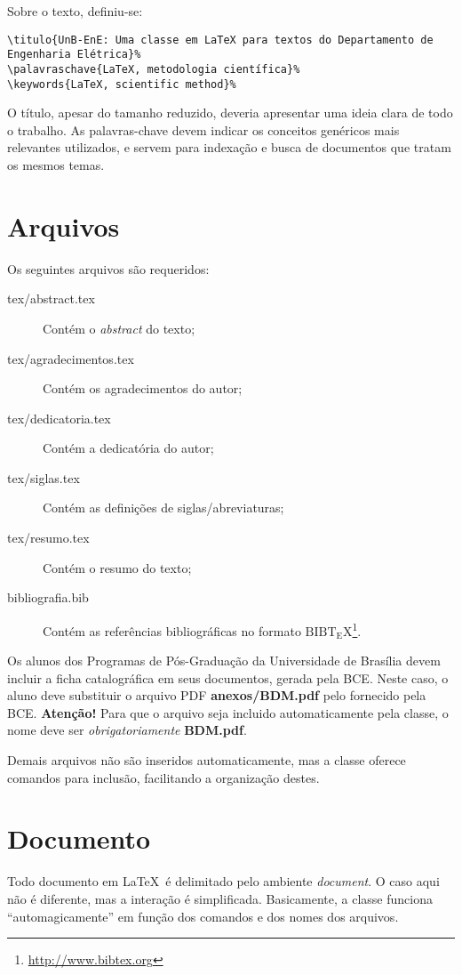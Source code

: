 Sobre o texto, definiu-se:
\begin{verbatim}
\titulo{UnB-EnE: Uma classe em LaTeX para textos do Departamento de Engenharia Elétrica}%
\palavraschave{LaTeX, metodologia científica}%
\keywords{LaTeX, scientific method}%
\end{verbatim}

O título, apesar do tamanho reduzido, deveria apresentar uma ideia clara de todo o trabalho. As
palavras-chave devem indicar os conceitos genéricos mais relevantes utilizados, e servem para 
indexação e busca de documentos que tratam os mesmos temas.


\section{Arquivos}
Os seguintes arquivos são requeridos:
\begin{description}%
	\item[tex/abstract.tex] Contém o \emph{abstract} do texto;%
	\item[tex/agradecimentos.tex] Contém os agradecimentos do autor;%
	\item[tex/dedicatoria.tex] Contém a dedicatória do autor;%
	\item[tex/siglas.tex] Contém as definições de siglas/abreviaturas;%
	\item[tex/resumo.tex] Contém o resumo do texto;%
	\item[bibliografia.bib] Contém as referências bibliográficas no formato
	${\mathrm{B{\scriptstyle{IB}}T_{\displaystyle E}X}}$\footnote{\url{http://www.bibtex.org}}.%
\end{description}%

Os alunos dos Programas de Pós-Graduação da Universidade de Brasília devem incluir a ficha 
catalográfica em seus documentos, gerada pela \acrfull{BCE}. Neste caso, o aluno deve substituir o 
arquivo PDF \textbf{anexos/BDM.pdf} pelo fornecido pela \acrshort{BCE}. \textbf{Atenção!} Para que
o arquivo seja incluido automaticamente pela classe, o nome deve ser \emph{obrigatoriamente} 
\textbf{BDM.pdf}.%

Demais arquivos não são inseridos automaticamente, mas a classe oferece comandos para inclusão,
facilitando a organização destes.

\section{Documento}
Todo documento em \LaTeX\ é delimitado pelo ambiente \emph{document}. O caso aqui não é diferente,
mas a interação é simplificada. Basicamente, a classe \unbene funciona ``automagicamente'' em 
função dos comandos e dos nomes dos arquivos.


